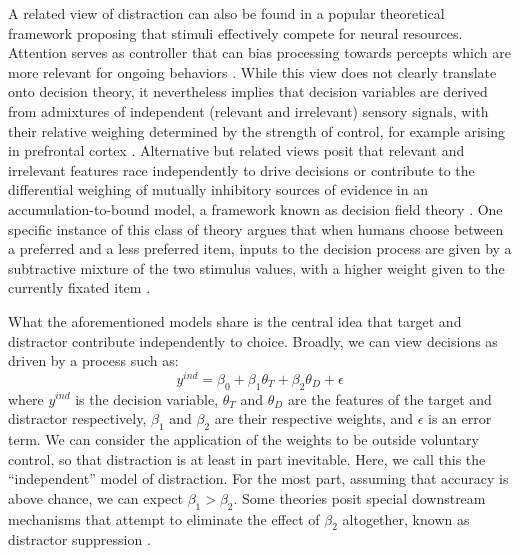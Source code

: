 \documentclass[a4paper, nobind]{templates/ociamthesis}
\begin{document}
A related view of distraction can also be found in a popular theoretical framework proposing that stimuli effectively compete for neural resources. Attention serves as controller that can bias processing towards percepts which are more relevant for ongoing behaviors \autocite{desimone1995}. While this view does not clearly translate onto decision theory, it nevertheless implies that decision variables are derived from admixtures of independent (relevant and irrelevant) sensory signals, with their relative weighing determined by the strength of control, for example arising in prefrontal cortex \autocite{miller2001,egner2005}. Alternative but related views posit that relevant and irrelevant features race independently to drive decisions \autocite{bundesen1990} or contribute to the differential weighing of mutually inhibitory sources of evidence in an accumulation-to-bound model, a framework known as decision field theory \autocite{busemeyer1993}. One specific instance of this class of theory argues that when humans choose between a preferred and a less preferred item, inputs to the decision process are given by a subtractive mixture of the two stimulus values, with a higher weight given to the currently fixated item \autocite{krajbich2010}.

What the aforementioned models share is the central idea that target and distractor contribute independently to choice. Broadly, we can view decisions as driven by a process such as:
\begin{equation}
y^{ind} = \beta_0 + \beta_1\theta_T + \beta_2\theta_D + \epsilon
\end{equation}
where \(y^{ind}\) is the decision variable, \(\theta_T\) and \(\theta_D\) are the features of the target and distractor respectively, \(\beta_1\) and \(\beta_2\) are their respective weights, and \(\epsilon\) is an error term. We can consider the application of the weights to be outside voluntary control, so that distraction is at least in part inevitable. Here, we call this the ``independent'' model of distraction. For the most part, assuming that accuracy is above chance, we can expect \(\beta_1>\beta_2\). Some theories posit special downstream mechanisms that attempt to eliminate the effect of \(\beta_2\) altogether, known as distractor suppression \autocite{geng2014,chelazzi2019}.
\end{document}
